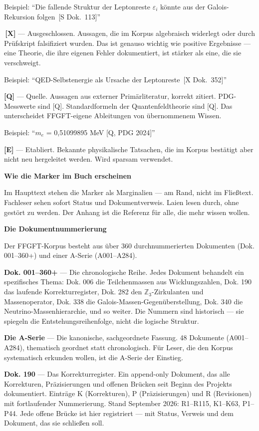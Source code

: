 \documentclass[11pt,oneside]{book}
\newcommand{\status}[1]{\penalty10000\,{\scriptsize\textcolor{gray!60}{[#1]}}}
\begin{document}
Beispiel: \enquote{Die fallende Struktur der Leptonreste $\varepsilon_i$ könnte aus der
Galois-Rekursion folgen \status{S Dok.~113}}


\textbf{\status{X}} — Ausgeschlossen. Aussagen, die im Korpus algebraisch widerlegt
oder durch Prüfskript falsifiziert wurden. Das ist genauso wichtig wie
positive Ergebnisse — eine Theorie, die ihre eigenen Fehler dokumentiert,
ist stärker als eine, die sie verschweigt.


Beispiel: \enquote{QED-Selbstenergie als Ursache der Leptonreste \status{X Dok.~352}}


\textbf{[Q]} — Quelle. Aussagen aus externer Primärliteratur, korrekt zitiert.
PDG-Messwerte sind [Q]. Standardformeln der Quantenfeldtheorie sind [Q].
Das unterscheidet FFGFT-eigene Ableitungen von übernommenem Wissen.


Beispiel: \enquote{$m_e$ = 0,51099895 MeV [Q, PDG 2024]}


\textbf{[E]} — Etabliert. Bekannte physikalische Tatsachen, die im Korpus
bestätigt aber nicht neu hergeleitet werden. Wird sparsam verwendet.


\textbf{Wie die Marker im Buch erscheinen}


Im Haupttext stehen die Marker als Marginalien — am Rand, nicht im
Fließtext. Fachleser sehen sofort Status und Dokumentverweis. Laien
lesen durch, ohne gestört zu werden. Der Anhang ist die Referenz für
alle, die mehr wissen wollen.




\textbf{Die Dokumentnummerierung}


Der FFGFT-Korpus besteht aus über 360 durchnummerierten Dokumenten
(Dok. 001–360+) und einer A-Serie (A001–A284).


\textbf{Dok. 001–360+} — Die chronologische Reihe. Jedes Dokument behandelt
ein spezifisches Thema: Dok. 006 die Teilchenmassen aus Wicklungszahlen,
Dok. 190 das laufende Korrekturregister, Dok. 282 den $\mathbb{Z}_3$-Zirkulanten
und Massenoperator, Dok. 338 die Galois-Massen-Gegenüberstellung,
Dok. 340 die Neutrino-Massenhierarchie, und so weiter. Die Nummern
sind historisch — sie spiegeln die Entstehungsreihenfolge, nicht die
logische Struktur.


\textbf{Die A-Serie} — Die kanonische, sachgeordnete Fassung. 48 Dokumente
(A001–A284), thematisch geordnet statt chronologisch. Für Leser, die
den Korpus systematisch erkunden wollen, ist die A-Serie der Einstieg.


\textbf{Dok. 190} — Das Korrekturregister. Ein append-only Dokument, das alle
Korrekturen, Präzisierungen und offenen Brücken seit Beginn des Projekts
dokumentiert. Einträge K (Korrekturen), P (Präzisierungen) und R (Revisionen)
mit fortlaufender Nummerierung. Stand September 2026: R1–R115, K1–K63,
P1–P44. Jede offene Brücke ist hier registriert — mit Status, Verweis
und dem Dokument, das sie schließen soll.
\end{document}
